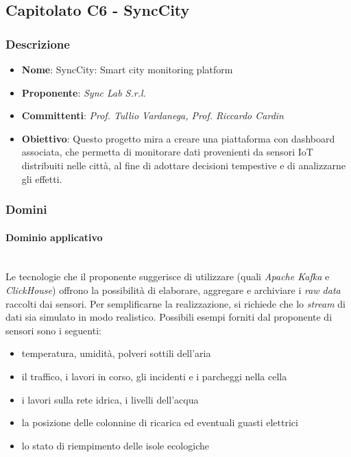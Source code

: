 \documentclass[italian,12pt]{article} %
\begin{document}
\subsection{Capitolato C6 - SyncCity}

\subsubsection{Descrizione}
\begin{itemize}
	\item \textbf{Nome}: SyncCity: Smart city monitoring platform
	\item \textbf{Proponente}: {\it Sync Lab S.r.l.}
	\item \textbf{Committenti}: {\it Prof. Tullio Vardanega, Prof. Riccardo Cardin}
	\item \textbf{Obiettivo}: Questo progetto mira a creare una piattaforma
	      con dashboard associata, che permetta di monitorare dati provenienti da sensori IoT
	      distribuiti nelle città, al fine di adottare decisioni tempestive
	      e di analizzarne gli effetti.
\end{itemize}

\subsubsection{Domini}
\paragraph{Dominio applicativo}\mbox{}\\
Le tecnologie che il proponente suggerisce di utilizzare (quali \textit{Apache Kafka} e \textit{ClickHouse}) offrono la possibilità di elaborare,
aggregare e archiviare i \textit{raw data} raccolti dai sensori.
Per semplificarne la realizzazione, si richiede che lo \textit{stream} di dati sia simulato in modo realistico.
Possibili esempi forniti dal proponente di sensori sono i seguenti:
\begin{itemize}\itemsep0em
	\item temperatura, umidità, polveri sottili dell’aria
	\item il traffico, i lavori in corso, gli incidenti e i parcheggi nella cella
	\item i lavori sulla rete idrica, i livelli dell'acqua
	\item la posizione delle colonnine di ricarica ed eventuali guasti elettrici
	\item lo stato di riempimento delle isole ecologiche
\end{itemize}
\end{document}
